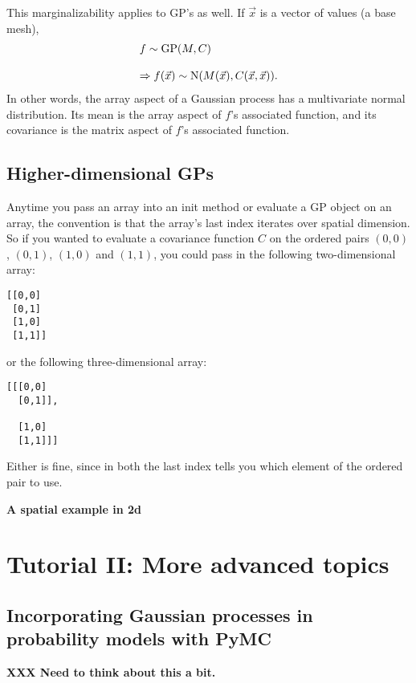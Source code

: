 \documentclass{manual}
\begin{document}
This marginalizability applies to GP's as well. If $\vec x$ is a vector of values (a base mesh),
\begin{equation}
	\begin{array}{l}
		f\sim\textup{GP}(M, C)\\\\
		\Rightarrow f(\vec x) \sim\textup N(M(\vec x), C(\vec x,\vec x)).
	\end{array}
\end{equation}
In other words, the array aspect of a Gaussian process  has a multivariate normal distribution. Its mean is the array aspect of $f$'s associated  function, and its covariance is the matrix aspect of $f$'s associated  function. 

\section{Higher-dimensional GPs}\label{sec:highdim} %
Anytime you pass an array into an init method or evaluate a GP object on an array, the convention is that the array's last index iterates over spatial dimension. So if you wanted to evaluate a covariance function $C$ on the ordered pairs $(0,0)$, $(0,1)$, $(1,0)$ and $(1,1)$, you could pass in the following two-dimensional array:
\begin{verbatim}
[[0,0]
 [0,1]
 [1,0]
 [1,1]]
\end{verbatim}
or the following three-dimensional array:
\begin{verbatim}
[[[0,0]
  [0,1]],

  [1,0]
  [1,1]]]
\end{verbatim}
Either is fine, since in both the last index tells you which element of the ordered pair to use.

\textbf{A spatial example in 2d}

\chapter{Tutorial II: More advanced topics}\label{cha:adv} %

\section{Incorporating Gaussian processes in probability models with PyMC}\label{sec:PyMC} %
\textbf{XXX Need to think about this a bit.}
\end{document}
